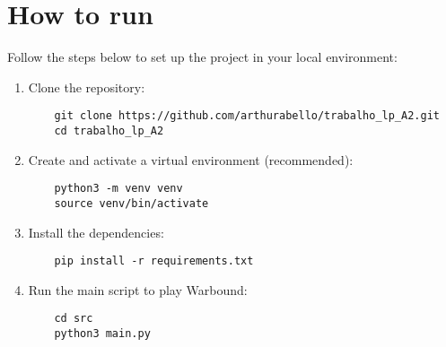 \section{How to run}

Follow the steps below to set up the project in your local environment:

\begin{enumerate}

\item Clone the repository:

\begin{verbatim}
    git clone https://github.com/arthurabello/trabalho_lp_A2.git
    cd trabalho_lp_A2
\end{verbatim}

\item Create and activate a virtual environment (recommended):

\begin{verbatim}
    python3 -m venv venv
    source venv/bin/activate
\end{verbatim}
 
\item Install the dependencies:

\begin{verbatim}
    pip install -r requirements.txt
\end{verbatim}

\item Run the main script to play Warbound:

\begin{verbatim}
    cd src
    python3 main.py
\end{verbatim}

\end{enumerate}
